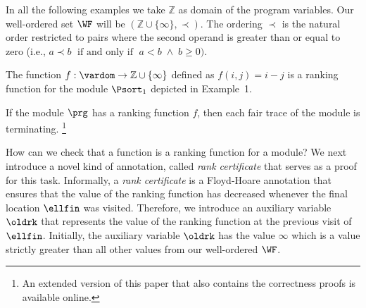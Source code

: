 In all the following examples we take $\mathbb{Z}$ as domain of the program variables. Our well-ordered set $\WF$ will be $(\mathbb{Z}\cup\{\infty\},\prec)$. The ordering $\prec$ is the natural order restricted to pairs where the second operand is greater than or equal to zero (i.e., $a\prec b \;\text{ if and only if }\; a<b \;\land\; b\geq 0)$.

\begin{example}
The function $f:\vardom\to\mathbb{Z}\cup\{\infty\}$ defined as $f(i,j) = i-j$ is a ranking function for the module $\Psort_1$ depicted in Example~1.
\end{example}

\begin{lemma}\label{lem:rankingfunc}
If the module $\prg$ has a ranking function $f$, then each fair trace of the module is terminating. \footnote{An extended version of this paper that also contains the correctness proofs is available online.}
\end{lemma}


How can we check that a function is a ranking function for a module?
We next introduce a novel kind of annotation, called \emph{rank certificate} that serves as a proof for this task.
Informally, a \emph{rank certificate} is a Floyd-Hoare annotation that ensures that the value of the ranking function has decreased whenever the final location $\ellfin$ was visited. Therefore, we introduce an auxiliary variable $\oldrk$ that represents the value of the ranking function at the previous visit of $\ellfin$.
Initially, the auxiliary variable $\oldrk$ has the value $\infty$ which is a value strictly greater than all other values from our well-ordered $\WF$.


